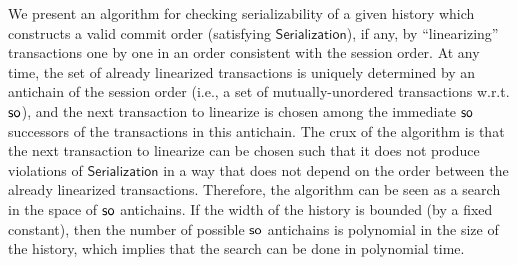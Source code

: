 We present an algorithm for checking serializability of a given history which constructs a valid commit order (satisfying $\mathsf{Serialization}$), if any, by 
``linearizing'' transactions one by one in an order consistent with the session order. At any time, the set of already linearized transactions is uniquely determined by an antichain of the session order (i.e., a set of mutually-unordered transactions w.r.t. $\mathsf{so}$), and the next transaction to linearize is chosen among the immediate $\mathsf{so}$ successors of the transactions in this antichain. The crux of the algorithm is that the next transaction to linearize can be chosen such that it does not produce violations of $\mathsf{Serialization}$ in a way that  does not depend on the order between the already linearized transactions. Therefore, the algorithm can be seen as a search in the space of $\mathsf{so}$ antichains. If the width of the history is bounded (by a fixed constant), then the number of possible $\mathsf{so}$ antichains is polynomial in the size of the history, which implies that the search can be done in polynomial time.

